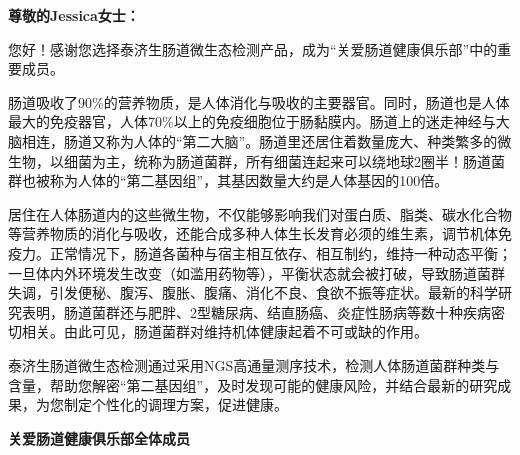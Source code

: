 



\setlength{\arrayrulewidth}{1pt}
\fontsize{9.3pt}{17pt}\selectfont
\color{gray2}

\vspace*{8mm}
{\noindent\bf\sanhao 尊敬的Jessica女士：}

\vspace*{6mm}

您好！感谢您选择泰济生肠道微生态检测产品，成为“关爱肠道健康俱乐部”中的重要成员。

肠道吸收了90{\%}的营养物质，是人体消化与吸收的主要器官。同时，肠道也是人体最大的免疫器官，人体70{\%}以上的免疫细胞位于肠黏膜内。肠道上的迷走神经与大脑相连，肠道又称为人体的“第二大脑”。肠道里还居住着数量庞大、种类繁多的微生物，以细菌为主，统称为肠道菌群，所有细菌连起来可以绕地球2圈半！肠道菌群也被称为人体的“第二基因组”，其基因数量大约是人体基因的100倍。

居住在人体肠道内的这些微生物，不仅能够影响我们对蛋白质、脂类、碳水化合物等营养物质的消化与吸收，还能合成多种人体生长发育必须的维生素，调节机体免疫力。正常情况下，肠道各菌种与宿主相互依存、相互制约，维持一种动态平衡；一旦体内外环境发生改变（如滥用药物等），平衡状态就会被打破，导致肠道菌群失调，引发便秘、腹泻、腹胀、腹痛、消化不良、食欲不振等症状。最新的科学研究表明，肠道菌群还与肥胖、2型糖尿病、结直肠癌、炎症性肠病等数十种疾病密切相关。由此可见，肠道菌群对维持机体健康起着不可或缺的作用。

泰济生肠道微生态检测通过采用NGS高通量测序技术，检测人体肠道菌群种类与含量，帮助您解密“第二基因组”，及时发现可能的健康风险，并结合最新的研究成果，为您制定个性化的调理方案，促进健康。

\vspace*{6mm}
\noindent\null\hfill
{\bf\sanhao 关爱肠道健康俱乐部全体成员}


